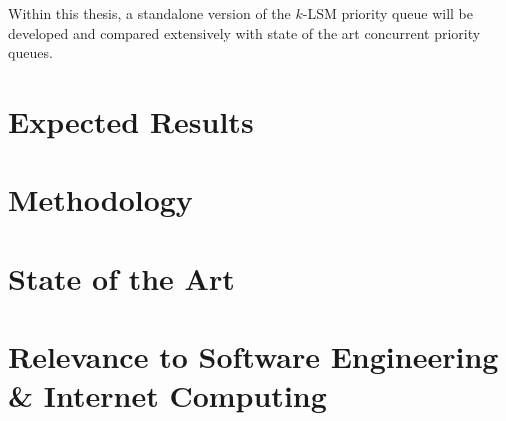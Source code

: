 \documentclass[a4paper,10pt]{article}
\begin{document}
Within this thesis, a standalone version of the $k$-LSM priority queue will be developed and
compared extensively with state of the art concurrent priority queues.

\section{Expected Results}

\section{Methodology}

\section{State of the Art}

\section{Relevance to Software Engineering \& Internet Computing}

\nocite{*} %
\printbibliography
\end{document}
